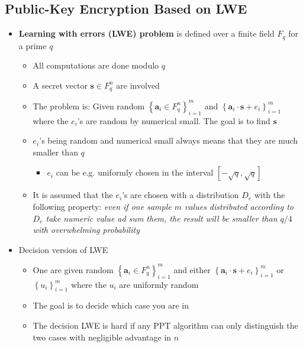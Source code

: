 \subsection{Public-Key Encryption Based on LWE}
\begin{itemize}
  \item \textbf{Learning with errors (LWE) problem} is defined over a finite field $F_q$ for a prime $q$
  \begin{itemize}
  	\item All computations are done modulo $q$
  	\item A secret vector $\mathbf{s} \in F_q^n$ are involved
  	\item The problem is: Given random $\left\{\mathbf{a}_{i} \in F_{q}^{n}\right\}_{i=1}^{m}$ and $\left\{\mathbf{a}_{i} \cdot \mathbf{s}+e_{i}\right\}_{i=1}^{m}$ where the $e_i$'s are random by numerical small. The goal is to find $\mathbf s$
  	\item $e_i$'s being random and numerical small always means that they are much smaller than $q$
    \begin{itemize}
  		\item $e_i$ can be e.g. uniformly chosen in the interval $[-\sqrt{q}, \sqrt{q}]$
    \end{itemize}
  	\item It is assumed that the $e_i$'s are chosen with a distribution $D_e$ with the following property: \textit{even if one sample $m$ values distributed according to $D_e$ take numeric value ad sum them, the result will be smaller than $q/4$ with overwhelming probability}
  \end{itemize}

  \item Decision version of LWE
  \begin{itemize}
  	\item One are given random $\left\{\mathbf{a}_{i} \in F_{q}^{n}\right\}_{i=1}^{m}$ and either $\left\{\mathbf{a}_{i} \cdot \mathbf{s}+e_{i}\right\}_{i=1}^{m}$ or $\left\{u_{i}\right\}_{i=1}^{m}$ where the $u_{i}$ are uniformly random
  	\item The goal is to decide which case you are in
  	\item The decision LWE is hard if any PPT algorithm can only distinguish the two cases with negligible advantage in $n$
  \end{itemize}


\end{itemize}
